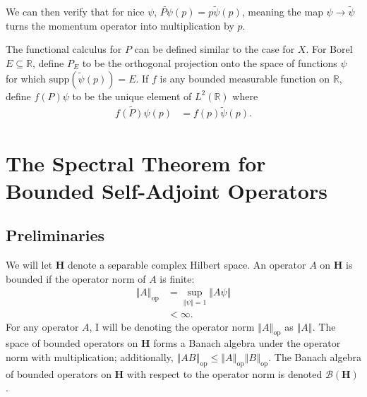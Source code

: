 \documentclass[10pt]{extarticle}
\newcommand{\R}{\mathbb{R}}
\newcommand{\norm}[1]{\left\Vert #1\right\Vert}
\theoremstyle{plain}
\theoremstyle{definition}
\theoremstyle{remark}
\renewcommand{\newline}{\hfill\break}
\begin{document}
  We can then verify that for nice $\psi$, $\widetilde{P\psi}(p) = p\tilde{\psi}(p)$, meaning the map $\psi \rightarrow \tilde{\psi}$ turns the momentum operator into multiplication by $p$.\newline

  The functional calculus for $P$ can be defined similar to the case for $X$. For Borel $E\subseteq \R$, define $P_E$ to be the orthogonal projection onto the space of functions $\psi$ for which $\text{supp}(\tilde{\psi}(p)) = E$. If $f$ is any bounded measurable function on $\R$, define $f(P)\psi$ to be the unique element of $L^{2}(\R)$ where
  \begin{align*}
    \widetilde{f(P)\psi}(p) &= f(p)\tilde{\psi}(p).
  \end{align*}
  \section{The Spectral Theorem for Bounded Self-Adjoint Operators}%
  \subsection{Preliminaries}%
  We will let $\mathbf{H}$ denote a separable complex Hilbert space. An operator $A$ on $\mathbf{H}$ is bounded if the operator norm of $A$ is finite:
  \begin{align*}
    \norm{A}_{\text{op}} &= \sup_{\norm{\psi} = 1}\norm{A\psi}\\
                         &< \infty.
  \end{align*}
  For any operator $A$, I will be denoting the operator norm $\norm{A}_{\text{op}} $ as $ \norm{A}$. The space of bounded operators on $\mathbf{H}$ forms a Banach algebra under the operator norm with multiplication; additionally, $\norm{AB}_{\text{op}}\leq \norm{A}_{\text{op}}\norm{B}_{\text{op}}$. The Banach algebra of bounded operators on $\mathbf{H}$ with respect to the operator norm is denoted $\mathcal{B}(\mathbf{H})$.\newline
\end{document}
